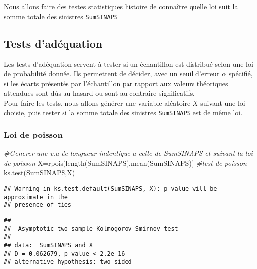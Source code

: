 \documentclass[
]{book}
\newenvironment{Shaded}{\begin{snugshade}}{\end{snugshade}}
\newcommand{\CommentTok}[1]{\textcolor[rgb]{0.56,0.35,0.01}{\textit{#1}}}
\newcommand{\FunctionTok}[1]{\textcolor[rgb]{0.00,0.00,0.00}{#1}}
\newcommand{\NormalTok}[1]{#1}
\newcommand{\OtherTok}[1]{\textcolor[rgb]{0.56,0.35,0.01}{#1}}
\newcommand{\SpecialCharTok}[1]{\textcolor[rgb]{0.00,0.00,0.00}{#1}}
\theoremstyle{definition}
\theoremstyle{definition}
\theoremstyle{definition}
\theoremstyle{definition}
\theoremstyle{remark}
\begin{document}
Nous allons faire des testes statistiques histoire de connaître quelle loi suit la somme totale des sinistres \texttt{SumSINAPS}

\hypertarget{tests-daduxe9quation}{%
\subsection{Tests d'adéquation}\label{tests-daduxe9quation}}

Les tests d'adéquation servent à tester si un échantillon est distribué selon une loi
de probabilité donnée. Ils permettent de décider, avec un seuil d'erreur \(\alpha\) spécifié, si les écarts présentés par l'échantillon par rapport aux valeurs théoriques attendues sont dûs au hasard ou sont au contraire significatifs.\\
Pour faire les tests, nous allons générer une variable aléatoire \(X\) suivant une loi choisie, puis tester si la somme totale des sinistres \texttt{SumSINAPS} est de même loi.

\begin{Shaded}
\end{Shaded}

\hypertarget{loi-de-poisson}{%
\subsubsection{Loi de poisson}\label{loi-de-poisson}}

\begin{Shaded}
\begin{Highlighting}[]
\CommentTok{\#Generer une v.a de longueur indentique a celle de SumSINAPS et suivant la loi de poisson}
\NormalTok{X}\OtherTok{=}\FunctionTok{rpois}\NormalTok{(}\FunctionTok{length}\NormalTok{(SumSINAPS),}\FunctionTok{mean}\NormalTok{(SumSINAPS))}
\CommentTok{\#test de poisson}
\FunctionTok{ks.test}\NormalTok{(SumSINAPS,X)}
\end{Highlighting}
\end{Shaded}

\begin{verbatim}
## Warning in ks.test.default(SumSINAPS, X): p-value will be approximate in the
## presence of ties
\end{verbatim}

\begin{verbatim}
## 
##  Asymptotic two-sample Kolmogorov-Smirnov test
## 
## data:  SumSINAPS and X
## D = 0.062679, p-value < 2.2e-16
## alternative hypothesis: two-sided
\end{verbatim}
\end{document}
